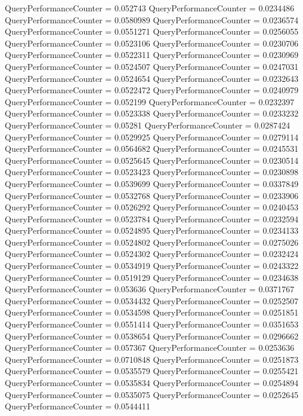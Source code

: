 \documentclass[9pt]{article}
\theoremstyle{plain}
\theoremstyle{definition}
\theoremstyle{remark}
\numberwithin{equation}{section}
\begin{document}
QueryPerformanceCounter  =  0.052743
QueryPerformanceCounter  =  0.0234486
QueryPerformanceCounter  =  0.0580989
QueryPerformanceCounter  =  0.0236574
QueryPerformanceCounter  =  0.0551271
QueryPerformanceCounter  =  0.0256055
QueryPerformanceCounter  =  0.0523106
QueryPerformanceCounter  =  0.0230706
QueryPerformanceCounter  =  0.0522311
QueryPerformanceCounter  =  0.0230969
QueryPerformanceCounter  =  0.0524507
QueryPerformanceCounter  =  0.0247031
QueryPerformanceCounter  =  0.0524654
QueryPerformanceCounter  =  0.0232643
QueryPerformanceCounter  =  0.0522472
QueryPerformanceCounter  =  0.0240979
QueryPerformanceCounter  =  0.052199
QueryPerformanceCounter  =  0.0232397
QueryPerformanceCounter  =  0.0523338
QueryPerformanceCounter  =  0.0233232
QueryPerformanceCounter  =  0.05281
QueryPerformanceCounter  =  0.0287424
QueryPerformanceCounter  =  0.0529925
QueryPerformanceCounter  =  0.0279114
QueryPerformanceCounter  =  0.0564682
QueryPerformanceCounter  =  0.0245531
QueryPerformanceCounter  =  0.0525645
QueryPerformanceCounter  =  0.0230514
QueryPerformanceCounter  =  0.0523423
QueryPerformanceCounter  =  0.0230898
QueryPerformanceCounter  =  0.0539699
QueryPerformanceCounter  =  0.0337849
QueryPerformanceCounter  =  0.0532768
QueryPerformanceCounter  =  0.0233906
QueryPerformanceCounter  =  0.0526292
QueryPerformanceCounter  =  0.0240453
QueryPerformanceCounter  =  0.0523784
QueryPerformanceCounter  =  0.0232594
QueryPerformanceCounter  =  0.0524895
QueryPerformanceCounter  =  0.0234133
QueryPerformanceCounter  =  0.0524802
QueryPerformanceCounter  =  0.0275026
QueryPerformanceCounter  =  0.0524302
QueryPerformanceCounter  =  0.0232424
QueryPerformanceCounter  =  0.0534919
QueryPerformanceCounter  =  0.0243322
QueryPerformanceCounter  =  0.0519129
QueryPerformanceCounter  =  0.0234638
QueryPerformanceCounter  =  0.053636
QueryPerformanceCounter  =  0.0371767
QueryPerformanceCounter  =  0.0534432
QueryPerformanceCounter  =  0.0252507
QueryPerformanceCounter  =  0.0534598
QueryPerformanceCounter  =  0.0251851
QueryPerformanceCounter  =  0.0551414
QueryPerformanceCounter  =  0.0351653
QueryPerformanceCounter  =  0.0538654
QueryPerformanceCounter  =  0.0296662
QueryPerformanceCounter  =  0.057367
QueryPerformanceCounter  =  0.0253636
QueryPerformanceCounter  =  0.0710848
QueryPerformanceCounter  =  0.0251873
QueryPerformanceCounter  =  0.0535579
QueryPerformanceCounter  =  0.0255421
QueryPerformanceCounter  =  0.0535834
QueryPerformanceCounter  =  0.0254894
QueryPerformanceCounter  =  0.0535075
QueryPerformanceCounter  =  0.0252645
QueryPerformanceCounter  =  0.0544411
\end{document}
